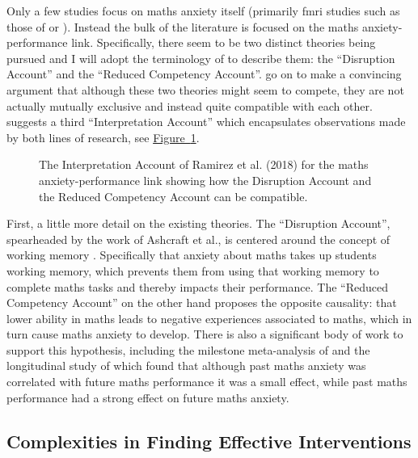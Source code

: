 \documentclass[twoside,12pt,a4paper]{report}
\newcommand{\reffig}[1]{\hyperref[fig:#1]{Figure~\ref{fig:#1}}}
\begin{document}
Only a few studies focus on maths anxiety itself (primarily \gls{fmri} studies such as those of   or ). Instead the bulk of the literature is focused on the maths anxiety-performance link.  Specifically, there seem to be two distinct theories being pursued and I will adopt the terminology of  to describe them: the ``Disruption Account'' and the ``Reduced Competency Account''.  go on to make a convincing argument that although these two theories might seem to compete, they are not actually mutually exclusive and instead quite compatible with each other.  suggests a third ``Interpretation Account'' which encapsulates observations made by both lines of research, see \reffig{ramirez}.

\begin{figure}
\begin{center}

\caption{The Interpretation Account of Ramirez et al. (2018) for the maths anxiety-performance link showing how the Disruption Account and the Reduced Competency Account can be compatible.
\label{fig:ramirez}}
\end{center}
\end{figure}

First, a little more detail on the existing theories. The ``Disruption Account'', spearheaded by the work of Ashcraft et al., is centered around the concept of working memory \cite{Ashcraft2001, Ashcraft2007}. Specifically that anxiety about maths takes up students working memory, which prevents them from using that working memory to complete maths tasks and thereby impacts their performance. The ``Reduced Competency Account'' on the other hand proposes the opposite causality: that lower ability in maths leads to negative experiences associated to maths, which in turn cause maths anxiety to develop. There is also a significant body of work to support this hypothesis, including the milestone meta-analysis of  and the longitudinal study of  which found that although past maths anxiety was correlated with future maths performance it was a small effect, while past maths performance had a strong effect on future maths anxiety.



\subsection*{Complexities in Finding Effective Interventions}
\end{document}
